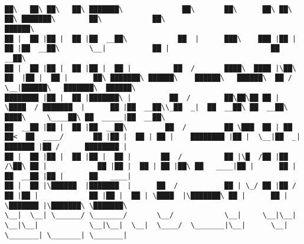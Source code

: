 \documentclass[varwidth=\maxdimen,margin=0.5cm,multi={verbatim}]{standalone}
\begin{document}
\begin{verbatim}

██\   ██\ ██\   ██\ ███████\              ██\       ██\      ██\ ██\   ██\ ███████\        ██\            ██\                          ██████\
██ |  ██ |██ |  ██ |██  __██\            ██  |      ███\    ███ |██ |  ██ |██  __██\       \__|           ██ |                        ██  __██\
██ |  ██ |██ |  ██ |██ |  ██ |          ██  /       ████\  ████ |\██\ ██  |██ |  ██ |      ██\ ███████\ ██████\    ██████\   ██████\  ██ /  \__|██████\   ███████\  ██████\
████████ |██ |  ██ |███████\ |         ██  /        ██\██\██ ██ | \████  / ███████  |      ██ |██  __██\\_██  _|  ██  __██\ ██  __██\ ████\     \____██\ ██  _____|██  __██\
██  __██ |██ |  ██ |██  __██\         ██  /         ██ \███  ██ | ██  ██<  ██  ____/       ██ |██ |  ██ | ██ |    ████████ |██ |  \__|██  _|    ███████ |██ /      ████████ |
██ |  ██ |██ |  ██ |██ |  ██ |       ██  /          ██ |\█  /██ |██  /\██\ ██ |            ██ |██ |  ██ | ██ |██\ ██   ____|██ |      ██ |     ██  __██ |██ |      ██   ____|
██ |  ██ |\██████  |███████  |      ██  /           ██ | \_/ ██ |██ /  ██ |██ |            ██ |██ |  ██ | \████  |\███████\ ██ |      ██ |     \███████ |\███████\ \███████\
\__|  \__| \______/ \_______/       \__/            \__|     \__|\__|  \__|\__|            \__|\__|  \__|  \____/  \_______|\__|      \__|      \_______| \_______| \_______|



\end{verbatim}
\end{document}
